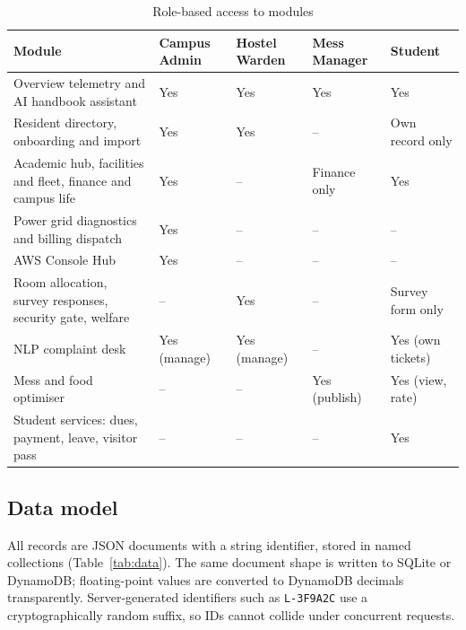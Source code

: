 \documentclass[12pt,a4paper,oneside]{report}
\newcommand{\head}{\rowcolor{headblue}}
\begin{document}
\begin{table}[!htbp]\centering\small
\caption{Role-based access to modules}\label{tab:roles}
\begin{tabularx}{\linewidth}{L>{\centering\arraybackslash}p{0.82in}>{\centering\arraybackslash}p{0.82in}>{\centering\arraybackslash}p{0.82in}>{\centering\arraybackslash}p{0.95in}}
\toprule\head \textbf{Module} & \textbf{Campus Admin} & \textbf{Hostel Warden} & \textbf{Mess Manager} & \textbf{Student}\\\midrule
Overview telemetry and AI handbook assistant & Yes & Yes & Yes & Yes\\
Resident directory, onboarding and import & Yes & Yes & -- & Own record only\\
Academic hub, facilities and fleet, finance and campus life & Yes & -- & Finance only & Yes\\
Power grid diagnostics and billing dispatch & Yes & -- & -- & --\\
AWS Console Hub & Yes & -- & -- & --\\
Room allocation, survey responses, security gate, welfare & -- & Yes & -- & Survey form only\\
NLP complaint desk & Yes (manage) & Yes (manage) & -- & Yes (own tickets)\\
Mess and food optimiser & -- & -- & Yes (publish) & Yes (view, rate)\\
Student services: dues, payment, leave, visitor pass & -- & -- & -- & Yes\\
\bottomrule
\end{tabularx}
\end{table}

\subsection{Data model}
All records are JSON documents with a string identifier, stored in named collections (Table~\ref{tab:data}). The same
document shape is written to SQLite or DynamoDB; floating-point values are converted to DynamoDB decimals
transparently. Server-generated identifiers such as \texttt{L-3F9A2C} use a cryptographically random suffix, so IDs
cannot collide under concurrent requests.
\end{document}
